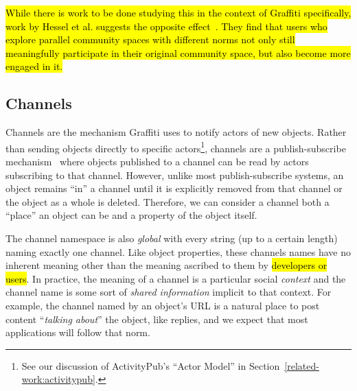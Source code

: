 \hl{%
While there is work to be done studying this in the context of Graffiti specifically,
work by Hessel et al.
suggests the opposite effect~{\cite{highlyrelatedcommunities}}.
They find that users who explore parallel community spaces
with different norms not only still meaningfully participate in their original community space,
but also become more engaged in it.
}%





\subsection{Channels}
\label{concepts:channels}

Channels are the mechanism Graffiti uses to notify
actors of new objects.
Rather than sending objects directly to specific actors\footnote{
    See our discussion of ActivityPub's ``Actor Model'' in Section~\ref{related-work:activitypub}.
},
channels are a publish-subscribe mechanism~\cite{pubsub}
where objects published to a channel
can be read by actors subscribing to that channel.
However, unlike most publish-subscribe systems,
an object remains ``in'' a channel until
it is explicitly removed from that channel
or the object as a whole is deleted.
Therefore, we can consider a channel both a ``place''
an object can be and a property of the object itself.

The channel namespace is also \emph{global} with every string (up to a certain length)
naming exactly one channel.
Like object properties, these channels names have no inherent meaning
other than the meaning ascribed to them by {\hl{developers or users}}.
In practice, the meaning of a channel is a particular social \emph{context} and the channel
name is some sort of \emph{shared information} implicit to that context.
For example, the channel named by an object's URL is a natural place to post content ``\emph{talking about}'' the object, like replies, and we expect that most applications will follow that norm.

